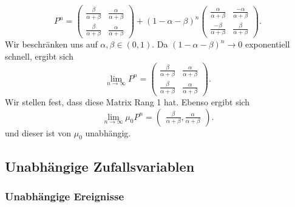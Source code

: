 \begin{example}
\begin{enumerate}[label=\protect\circled{\alph*}]
            \[
                P^n = \begin{pmatrix} \frac{β}{α+β} & \frac{α}{α+β} \\ \frac{β}{α+β} & \frac{α}{α+β} \end{pmatrix}  + (1-α-β)^n \begin{pmatrix} \frac{α}{α+β} & \frac{-α }{\alpha + \beta} \\ \frac{-\beta }{\alpha + \beta} & \frac{\beta}{\alpha + \beta} \end{pmatrix} 
            .\] 
            Wir beschränken uns auf $α,β \in (0,1)$. Da $(1-α-β)^n \to 0$ exponentiell schnell, ergibt sich
            \[
            \lim_{n \to \infty} P^n = \begin{pmatrix} \frac{β}{α+β} & \frac{α}{α+β} \\ \frac{β}{α+β} & \frac{α}{α+β} \end{pmatrix} 
            .\] 
            Wir stellen fest, dass diese Matrix Rang 1 hat. Ebenso ergibt sich
\[
\lim_{n \to \infty} \mu_0 P^n = \begin{pmatrix} \frac{β}{α+β}, \frac{α}{α+β} \end{pmatrix} 
.\] 
und dieser ist von $μ_0$ unabhängig.
    \end{enumerate}
\end{example}
\subsection{Unabhängige Zufallsvariablen}
\subsubsection{Unabhängige Ereignisse}

